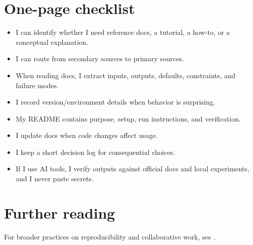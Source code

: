 \section{One-page checklist}
\begin{itemize}[noitemsep]
  \item I can identify whether I need reference docs, a tutorial, a how-to, or a conceptual explanation.
  \item I can route from secondary sources to primary sources.
  \item When reading docs, I extract inputs, outputs, defaults, constraints, and failure modes.
  \item I record version/environment details when behavior is surprising.
  \item My README contains purpose, setup, run instructions, and verification.
  \item I update docs when code changes affect usage.
  \item I keep a short decision log for consequential choices.
  \item If I use AI tools, I verify outputs against official docs and local experiments, and I never paste secrets.
\end{itemize}

\section*{Further reading}
For broader practices on reproducibility and collaborative work, see \cite{wilson2017goodenough,turingway2025zenodo}.